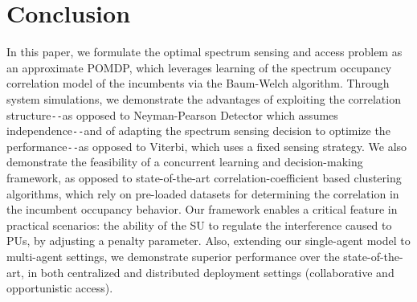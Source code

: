 \documentclass[12pt, draftcls, onecolumn]{IEEEtran}
\begin{document}
\section{Conclusion}\label{V}
In this paper, we formulate the optimal spectrum sensing and access problem as an approximate POMDP, which leverages learning of the spectrum occupancy correlation model of the incumbents via the Baum-Welch algorithm. Through system simulations, we demonstrate the advantages of exploiting the correlation structure\texttt{-{}-}as opposed to Neyman-Pearson Detector which assumes independence\texttt{-{}-}and of adapting the spectrum sensing decision to optimize the performance\texttt{-{}-}as opposed to Viterbi, which uses a fixed sensing strategy. We also demonstrate the feasibility of a concurrent learning and decision-making framework, as opposed to state-of-the-art correlation-coefficient based clustering algorithms, which rely on pre-loaded datasets for determining the correlation in the incumbent occupancy behavior. Our framework enables a critical feature in practical scenarios: the ability of the SU to regulate the interference caused to PUs, by adjusting a penalty parameter. Also, extending our single-agent model to multi-agent settings, we demonstrate superior performance over the state-of-the-art, in both centralized and distributed deployment settings (collaborative and opportunistic access).


\end{document}
